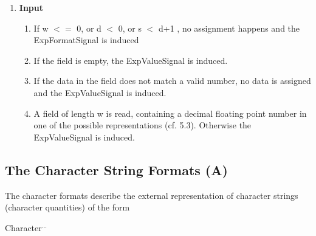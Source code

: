 \begin{enumerate}
\begin{enumerate}
\end{enumerate}
 
\item {\bf Input}\\
\begin{enumerate}
\item If w $<=$ 0, or d $<$ 0, or s $<$ 
d+1 , no assignment happens and  
         the ExpFormatSignal is induced
\item If the field  is empty, the ExpValueSignal is induced.
\item If the data in the field does not match a valid number, 
 no data is assigned and the ExpValueSignal is induced.
\item A field of length w is read,
    containing a decimal floating point number
    in one of the possible representations (cf. 5.3).
    Otherwise the ExpValueSignal is induced.
\end{enumerate}
\end{enumerate}


\subsection{The Character String Formats (A)}  %
\label{sec_dation_a_format}




The character formats describe the external representation of character
strings (character quantities) of the form

Character$^{...}$


